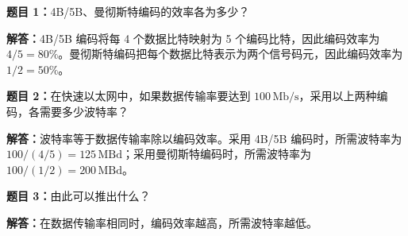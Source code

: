 \documentclass[UTF8,11pt,a4paper]{ctexart}
\begin{document}
\noindent\textbf{题目 1：}4B/5B、曼彻斯特编码的效率各为多少？

\noindent\textbf{解答：}4B/5B 编码将每 4 个数据比特映射为 5 个编码比特，因此编码效率为 $4/5=80\%$。曼彻斯特编码把每个数据比特表示为两个信号码元，因此编码效率为 $1/2=50\%$。

\medskip

\noindent\textbf{题目 2：}在快速以太网中，如果数据传输率要达到 $100\,\mathrm{Mb/s}$，采用以上两种编码，各需要多少波特率？

\noindent\textbf{解答：}波特率等于数据传输率除以编码效率。采用 4B/5B 编码时，所需波特率为 $100/(4/5)=125\,\mathrm{MBd}$；采用曼彻斯特编码时，所需波特率为 $100/(1/2)=200\,\mathrm{MBd}$。

\medskip

\noindent\textbf{题目 3：}由此可以推出什么？

\noindent\textbf{解答：}在数据传输率相同时，编码效率越高，所需波特率越低。
\end{document}
